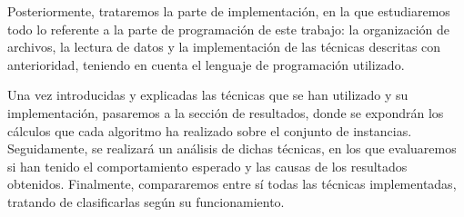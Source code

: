 Posteriormente, trataremos la parte de implementación, en la que estudiaremos todo lo
referente a la parte de programación de este trabajo: la organización de archivos,
la lectura de datos y la implementación de las técnicas descritas con anterioridad,
teniendo en cuenta el lenguaje de programación utilizado.

Una vez introducidas y explicadas las técnicas que se han utilizado y su implementación,
pasaremos a la sección de resultados, donde se expondrán los cálculos que cada algoritmo
ha realizado sobre el conjunto de instancias. Seguidamente, se realizará un análisis
de dichas técnicas, en los que evaluaremos si han tenido el comportamiento esperado y
las causas de los resultados obtenidos. Finalmente, compararemos entre sí todas las
técnicas implementadas, tratando de clasificarlas según su funcionamiento.
